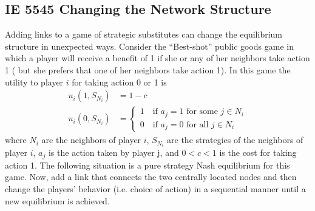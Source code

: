 \documentclass{article}
\begin{document}
\subsection{IE 5545 Changing the Network Structure}
Adding links to a game of strategic substitutes can change the
equilibrium structure in unexpected ways.  Consider the ``Best-shot''
public goods game in which a player will receive a benefit of 1 if she
or any of her neighbors take action 1 ( but she prefers that one of
her neighbors take action 1). In this game the utility to player
$i$ for taking action 0 or 1 is
\begin{align*}
  u_i(1,S_{N_i}) &= 1 - c\\
  u_i(0,S_{N_i}) &= \begin{cases}
    1 \quad \text{if $a_j=1$ for some $j \in N_i$}\\
    0 \quad \text{if $a_j=0$ for all $j \in N_i$}
    \end{cases}
\end{align*}
where $N_i$ are the neighbors of player $i$, $S_{N_i}$ are the
strategies of the neighbors of player $i$, $a_j$ is the action taken
by player j, and $0 < c < 1$ is the cost for taking action 1.  The
following situation is a pure strategy Nash equilibrium for this
game. Now, add a link that connects the two centrally located nodes
and then change the players' behavior (i.e. choice of action) in a
sequential manner until a new equilibrium is achieved.

\vspace{.5in}
\begin{center}
\end{center}
\end{document}

